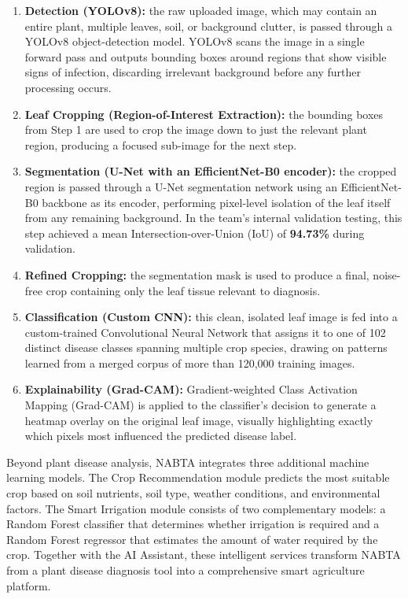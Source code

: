 \begin{enumerate}[leftmargin=*,label=\textbf{Step \arabic*.}]
\item \textbf{Detection (YOLOv8):} the raw uploaded image, which may contain an entire plant, multiple leaves, soil, or background clutter, is passed through a YOLOv8 object-detection model. YOLOv8 scans the image in a single forward pass and outputs bounding boxes around regions that show visible signs of infection, discarding irrelevant background before any further processing occurs.
\item \textbf{Leaf Cropping (Region-of-Interest Extraction):} the bounding boxes from Step 1 are used to crop the image down to just the relevant plant region, producing a focused sub-image for the next step.
\item \textbf{Segmentation (U-Net with an EfficientNet-B0 encoder):} the cropped region is passed through a U-Net segmentation network using an EfficientNet-B0 backbone as its encoder, performing pixel-level isolation of the leaf itself from any remaining background. In the team's internal validation testing, this step achieved a mean Intersection-over-Union (IoU) of \textbf{94.73\%} during validation.
\item \textbf{Refined Cropping:} the segmentation mask is used to produce a final, noise-free crop containing only the leaf tissue relevant to diagnosis.
\item \textbf{Classification (Custom CNN):} this clean, isolated leaf image is fed into a custom-trained Convolutional Neural Network that assigns it to one of 102 distinct disease classes spanning multiple crop species, drawing on patterns learned from a merged corpus of more than 120,000 training images.
\item \textbf{Explainability (Grad-CAM):} Gradient-weighted Class Activation Mapping (Grad-CAM) is applied to the classifier's decision to generate a heatmap overlay on the original leaf image, visually highlighting exactly which pixels most influenced the predicted disease label.
\end{enumerate}

Beyond plant disease analysis, NABTA integrates three additional machine learning models. The Crop Recommendation module predicts the most suitable crop based on soil nutrients, soil type, weather conditions, and environmental factors. The Smart Irrigation module consists of two complementary models: a Random Forest classifier that determines whether irrigation is required and a Random Forest regressor that estimates the amount of water required by the crop. Together with the AI Assistant, these intelligent services transform NABTA from a plant disease diagnosis tool into a comprehensive smart agriculture platform.

